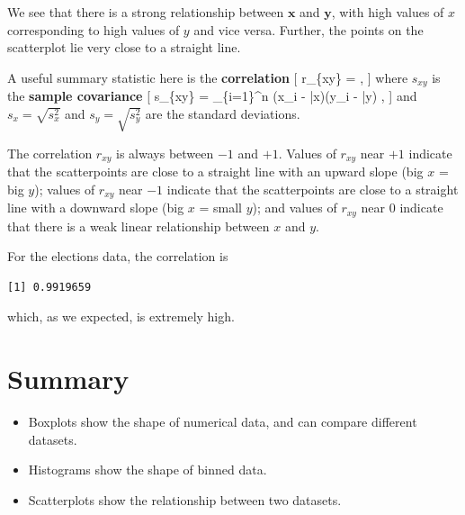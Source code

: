 \documentclass[
  letterpaper,
]{report}
\newenvironment{Shaded}{\begin{snugshade}}{\end{snugshade}}
\newcommand{\FunctionTok}[1]{\textcolor[rgb]{0.28,0.35,0.67}{#1}}
\newcommand{\NormalTok}[1]{\textcolor[rgb]{0.00,0.23,0.31}{#1}}
\newcommand{\SpecialCharTok}[1]{\textcolor[rgb]{0.37,0.37,0.37}{#1}}
\providecommand{\tightlist}{%
  \setlength{\itemsep}{0pt}\setlength{\parskip}{0pt}}\usepackage{longtable,booktabs,array}
\theoremstyle{definition}
\theoremstyle{definition}
\theoremstyle{remark}
\begin{document}
We see that there is a strong relationship between \(\mathbf x\) and
\(\mathbf y\), with high values of \(x\) corresponding to high values of
\(y\) and vice versa. Further, the points on the scatterplot lie very
close to a straight line.

A useful summary statistic here is the \textbf{correlation} {[}
r\_\{xy\} =  , {]} where \(s_{xy}\) is the
\textbf{sample covariance} {[} s\_\{xy\} = 
\sum\_\{i=1\}\^{}n (x\_i - \bar x)(y\_i - \bar y) , {]} and
\(s_x = \sqrt{s_x^2}\) and \(s_y = \sqrt{s_y^2}\) are the standard
deviations.

The correlation \(r_{xy}\) is always between \(-1\) and \(+1\). Values
of \(r_{xy}\) near \(+1\) indicate that the scatterpoints are close to a
straight line with an upward slope (big \(x\) = big \(y\)); values of
\(r_{xy}\) near \(-1\) indicate that the scatterpoints are close to a
straight line with a downward slope (big \(x\) = small \(y\)); and
values of \(r_{xy}\) near 0 indicate that there is a weak linear
relationship between \(x\) and \(y\).

For the elections data, the correlation is

\begin{Shaded}
\end{Shaded}

\begin{verbatim}
[1] 0.9919659
\end{verbatim}

which, as we expected, is extremely high.

\hypertarget{summary-02}{%
\section*{Summary}\label{summary-02}}


\begin{itemize}
\tightlist
\item
  Boxplots show the shape of numerical data, and can compare different
  datasets.
\item
  Histograms show the shape of binned data.
\item
  Scatterplots show the relationship between two datasets.
\end{itemize}
\end{document}
